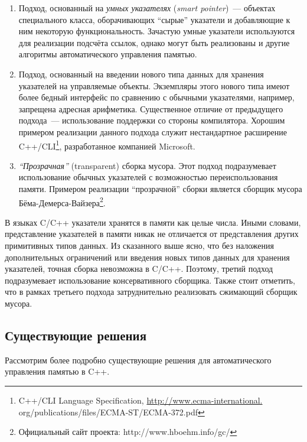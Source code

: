 \begin{enumerate}
\item 
	Подход, основанный на \emph{умных указателях} (\emph{smart pointer})~--- 
	объектах специального класса, оборачивающих ``сырые'' указатели и добавляющие 
	к ним некоторую функциональность. 
	Зачастую умные указатели используются для реализации подсчёта ссылок, однако могут 
	быть реализованы и другие алгоритмы автоматического управления памятью.
\item 
	Подход, основанный на введении нового типа данных для хранения указателей на 
	управляемые объекты. 
	Экземпляры этого нового типа имеют более бедный интерфейс по сравнению с обычными 
	указателями, например, запрещена адресная арифметика. Существенное отличие от 
	предыдущего подхода~--- использование поддержки со стороны компилятора. 
	Хорошим примером реализации данного подхода служит нестандартное расширение 
	C++/CLI\footnote{C++/CLI Language Specification,
	\url{http://www.ecma-international.}\\{org/publications/files/ECMA-ST/ECMA-372.pdf}}, разработанное компанией Microsoft.
\item 
	\emph{``Прозрачная''} (transparent) сборка мусора. Этот подход подразумевает 
	использование обычных указателей с возможностью переиспользования памяти. 
	Примером реализации ``прозрачной'' сборки является сборщик мусора 
	Бёма-Демерса-Вайзера\footnote{Официальный сайт проекта: http://www.hboehm.info/gc/}.
\end{enumerate}

В языках C/C++ указатели хранятся в памяти как целые числа. 
Иными словами, представление указателей в памяти никак не отличается от представления 
других примитивных типов данных. 
Из сказанного выше ясно, что без наложения дополнительных ограничений или введения новых 
типов данных для хранения указателей, точная сборка невозможна в C/C++. 
Поэтому, третий подход подразумевает использование консервативного сборщика. 
Также стоит отметить, что в рамках третьего подхода затруднительно реализовать 
сжимающий сборщик мусора.


\subsection{Существующие решения}
\label{sec:cpp_solutions}

Рассмотрим более подробно существующие решения для автоматического управления памятью в C++. 

